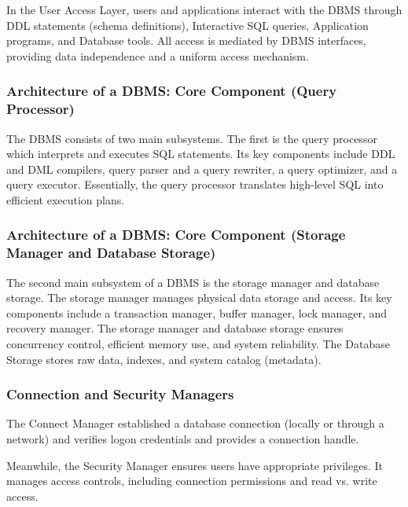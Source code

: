 \documentclass[11pt]{article}
\begin{document}
In the User Access Layer, users and applications interact with the DBMS through DDL statements (schema definitions), Interactive SQL queries, Application programs, and Database tools. All access is mediated by DBMS interfaces, providing data independence and a uniform access mechanism.

\vspace{11pt}
\subsubsection{Architecture of a DBMS: Core Component (Query Processor)}
\vspace{11pt}

The DBMS consists of two main subsystems. The first is the query processor which interprets and executes SQL statements. Its key components include DDL and DML compilers, query parser and a query rewriter, a query optimizer, and a query executor. Essentially, the query processor translates high-level SQL into efficient execution plans.

\vspace{11pt}
\subsubsection{Architecture of a DBMS: Core Component (Storage Manager and Database Storage)}
\vspace{11pt}

The second main subsystem of a DBMS is the storage manager and database storage. The storage manager manages physical data storage and access. Its key components include a transaction manager, buffer manager, lock manager, and recovery manager. The storage manager and database storage ensures concurrency control, efficient memory use, and system reliability. The Database Storage stores raw data, indexes, and system catalog (metadata).

\vspace{11pt}
\subsubsection{Connection and Security Managers}
\vspace{11pt}

The Connect Manager established a database connection (locally or through a network) and verifies logon credentials and provides a connection handle.

Meanwhile, the Security Manager ensures users have appropriate privileges. It manages access controls, including connection permissions and read vs. write access.
\end{document}
